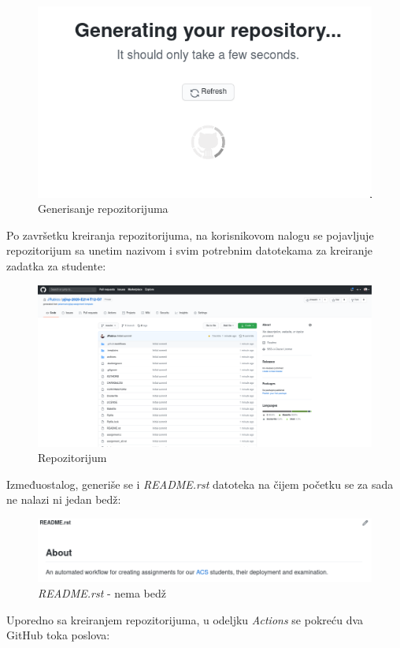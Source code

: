 \documentclass[12pt]{report}
\begin{document}
\begin{figure}[H]
    \centering
    \includegraphics[width=0.6\linewidth]{images/3.png}
    \caption{Generisanje repozitorijuma}
\end{figure}

Po završetku kreiranja repozitorijuma, na korisnikovom nalogu se pojavljuje repozitorijum sa unetim nazivom i svim potrebnim datotekama za kreiranje zadatka za studente:

\begin{figure}[H]
    \centering
    \includegraphics[width=\linewidth]{images/4.png}
    \caption{Repozitorijum}
\end{figure}

Izmeđuostalog, generiše se i \textit{README.rst} datoteka na čijem početku se za sada ne nalazi ni jedan bedž:

\begin{figure}[H]
    \centering
    \includegraphics[width=\linewidth]{images/5.png}
    \caption{\textit{README.rst} - nema bedž}
\end{figure}

Uporedno sa kreiranjem repozitorijuma, u odeljku \textit{Actions} se pokreću dva GitHub toka poslova:
\end{document}
